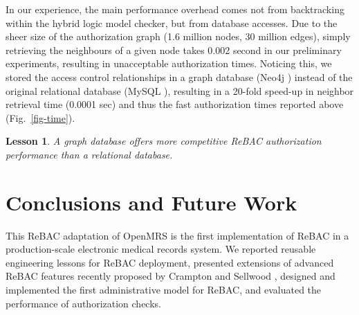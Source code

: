 \documentclass{acm_proc_article-sp}
\newtheorem{lesson}{Lesson}
\begin{document}
In our experience, the main performance overhead comes not from
backtracking within the hybrid logic model checker, but from database
accesses.  Due to the sheer size of the authorization graph (1.6
million nodes, 30 million edges), simply retrieving the neighbours of
a given node takes 0.002 second in our preliminary experiments,
resulting in unacceptable authorization times.  Noticing this, we
stored the access control relationships in a graph database (Neo4j
\cite{Neo4J}) instead of the original relational database (MySQL
\cite{MySQL}), resulting in a 20-fold speed-up in neighbor
retrieval time (0.0001 sec) and thus the fast authorization
times reported above (Fig.~\ref{fig-time}).
\begin{lesson}
  A graph database offers more competitive ReBAC authorization 
  performance than a relational database.
\end{lesson}



\begin{comment}
Another observation is that the authorization graph we
have constructed has a topology not typical for the healthcare domain.
For example, a patient has over 50 agents, whereas the typical number
in a read application would be one. Future efforts in the synthesis
of a realistic dataset would
provide more informative performance statistics.
\end{comment}

\section{Conclusions and Future Work}

This ReBAC adaptation of OpenMRS is the first implementation of ReBAC
in a production-scale electronic medical records system.  We reported
reusable engineering lessons for ReBAC deployment,
presented extensions of advanced
ReBAC features recently proposed by Crampton and Sellwood
\cite{Crampton-Sellwood:2014}, designed and implemented the first
administrative model for ReBAC, and evaluated the performance of
authorization checks.
\end{document}
